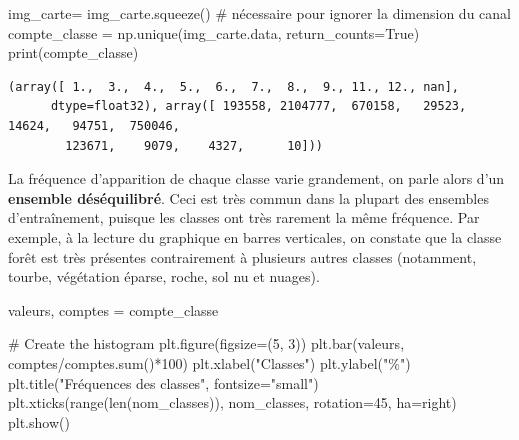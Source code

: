 \documentclass[
  11pt,
  letterpaper,
  open=any,
  twoside=false,
  french]{scrbook}
\newenvironment{Shaded}{\begin{snugshade}}{\end{snugshade}}
\newcommand{\BuiltInTok}[1]{\textcolor[rgb]{0.00,0.23,0.31}{#1}}
\newcommand{\CommentTok}[1]{\textcolor[rgb]{0.37,0.37,0.37}{#1}}
\newcommand{\DecValTok}[1]{\textcolor[rgb]{0.68,0.00,0.00}{#1}}
\newcommand{\NormalTok}[1]{\textcolor[rgb]{0.00,0.23,0.31}{#1}}
\newcommand{\OperatorTok}[1]{\textcolor[rgb]{0.37,0.37,0.37}{#1}}
\newcommand{\StringTok}[1]{\textcolor[rgb]{0.13,0.47,0.30}{#1}}
\newcommand{\VariableTok}[1]{\textcolor[rgb]{0.07,0.07,0.07}{#1}}
\begin{document}
\begin{Shaded}
\begin{Highlighting}[]
\NormalTok{img\_carte}\OperatorTok{=}\NormalTok{ img\_carte.squeeze() }\CommentTok{\# nécessaire pour ignorer la dimension du canal}
\NormalTok{compte\_classe }\OperatorTok{=}\NormalTok{ np.unique(img\_carte.data, return\_counts}\OperatorTok{=}\VariableTok{True}\NormalTok{)}
\BuiltInTok{print}\NormalTok{(compte\_classe)}
\end{Highlighting}
\end{Shaded}

\begin{verbatim}
(array([ 1.,  3.,  4.,  5.,  6.,  7.,  8.,  9., 11., 12., nan],
      dtype=float32), array([ 193558, 2104777,  670158,   29523,   14624,   94751,  750046,
        123671,    9079,    4327,      10]))
\end{verbatim}

La fréquence d'apparition de chaque classe varie grandement, on parle
alors d'un \textbf{ensemble déséquilibré}. Ceci est très commun dans la
plupart des ensembles d'entraînement, puisque les classes ont très
rarement la même fréquence. Par exemple, à la lecture du graphique en
barres verticales, on constate que la classe forêt est très présentes
contrairement à plusieurs autres classes (notamment, tourbe, végétation
éparse, roche, sol nu et nuages).

\begin{Shaded}
\begin{Highlighting}[]
\NormalTok{valeurs, comptes }\OperatorTok{=}\NormalTok{ compte\_classe}

\CommentTok{\# Create the histogram}
\NormalTok{plt.figure(figsize}\OperatorTok{=}\NormalTok{(}\DecValTok{5}\NormalTok{, }\DecValTok{3}\NormalTok{))}
\NormalTok{plt.bar(valeurs, comptes}\OperatorTok{/}\NormalTok{comptes.}\BuiltInTok{sum}\NormalTok{()}\OperatorTok{*}\DecValTok{100}\NormalTok{)}
\NormalTok{plt.xlabel(}\StringTok{"Classes"}\NormalTok{)}
\NormalTok{plt.ylabel(}\StringTok{"\%"}\NormalTok{)}
\NormalTok{plt.title(}\StringTok{"Fréquences des classes"}\NormalTok{, fontsize}\OperatorTok{=}\StringTok{"small"}\NormalTok{)}
\NormalTok{plt.xticks(}\BuiltInTok{range}\NormalTok{(}\BuiltInTok{len}\NormalTok{(nom\_classes)), nom\_classes, rotation}\OperatorTok{=}\DecValTok{45}\NormalTok{, ha}\OperatorTok{=}\StringTok{\textquotesingle{}right\textquotesingle{}}\NormalTok{)}
\NormalTok{plt.show()}
\end{Highlighting}
\end{Shaded}
\end{document}

